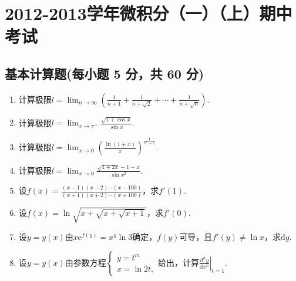 \documentclass[../main.tex]{subfiles}
\begin{document}
\chapter{2012-2013学年微积分（一）（上）期中考试}

\section{基本计算题(每小题 5 分，共 60 分)}
\begin{enumerate}
    \item 计算极限$l=\lim_{n\to\infty}\left(\frac{1}{n+1}+\frac{1}{n+\sqrt{2}}+\cdots
              +\frac{1}{n+\sqrt{n}}\right)$.
          \vspace{7em}

    \item 计算极限$l=\lim_{x\to \pi^+}\frac{\sqrt{1+\cos x}}{\sin x}$.
          \vspace{7em}

    \item 计算极限$l=\lim_{x\to 0}\left(\frac{\ln(1+x)}{x}\right)^{\frac{1}{\mathrm{e}^{x}-1}}$.
          \vspace{8em}

    \item 计算极限$l=\lim_{x\to0}\frac{\sqrt{1+2x}-1-x}{\sin x^{2}}$.
          \vspace{8em}

    \item 设$f(x)=\frac{(x-1)(x-2)\cdots(x-100)}{(x+1)(x+2)\cdots(x+100)}$，求$f'
              (1)$.
          \vspace{8em}

    \item 设$f(x)=\ln\sqrt{x+\sqrt{x+\sqrt{x+1}}}$，求$f'(0)$.
          \vspace{7em}

    \item 设$y=y(x)$由$x\mathrm{e}^{f(y)}=x^{y}\ln 3$确定，$f(y)$可导，且$f'(y)\neq
              \ln x$，求$\mathrm{d}y$.
          \vspace{7em}

    \item 设$y=y(x)$由参数方程$\begin{cases}
                  y=t^{m} \\
                  x=\ln 2t,
              \end{cases}$给出，计算$\left.\frac{\mathrm{d}^{n} y}{\mathrm{d}x^{n}}\right
              |_{t=1}$.
          \vspace{8em}


\end{enumerate}
\end{document}
